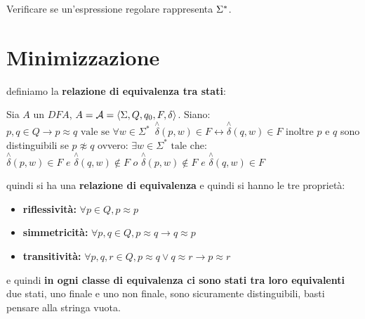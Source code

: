 Verificare se un'espressione regolare rappresenta $\Sigma{}^{\ast}$.


\section{Minimizzazione}
definiamo la \textbf{relazione di equivalenza tra stati}:
\begin{definition}
	Sia $A$ un $DFA$, $A=\mathcal{A}=\langle \Sigma, Q, q_{0}, F, \delta \rangle$. Siano:
	$p,q\in Q\to p\approx q\text{ vale se } \forall w \in \Sigma^*\,\,\, \stackrel{\wedge}{\delta}(p,w)\in F\longleftrightarrow \stackrel{\wedge}{\delta}(q,w)\in F$
	inoltre $p$ e $q$ sono distinguibili se $p\not\approx q$ ovvero:
	$\exists w\in \Sigma^*\text{ tale che:} $
	$\stackrel{\wedge}{\delta}(p,w)\in F \,\,e\,\,\stackrel{\wedge}{\delta}(q,w)\not\in F\,\,o\,\,\stackrel{\wedge}{\delta}(p,w)\not\in F \,\,e\,\,\stackrel{\wedge}{\delta}(q,w)\in F$
\end{definition}
quindi si ha una \textbf{relazione di equivalenza} e quindi si hanno le tre proprietà:
\begin{itemize}
	\item \textbf{riflessività:} $\forall p\in Q, p\approx p$
	\item \textbf{simmetricità:} $\forall p,q\in Q, p\approx q\to q\approx p$
	\item \textbf{transitività:} $\forall p,q,r\in Q, p\approx q\vee q\approx r\to p\approx r$
\end{itemize}
e quindi \textbf{in ogni classe di equivalenza ci sono stati tra loro equivalenti}
due stati, uno finale e uno non finale, sono sicuramente distinguibili, basti pensare alla stringa vuota.

